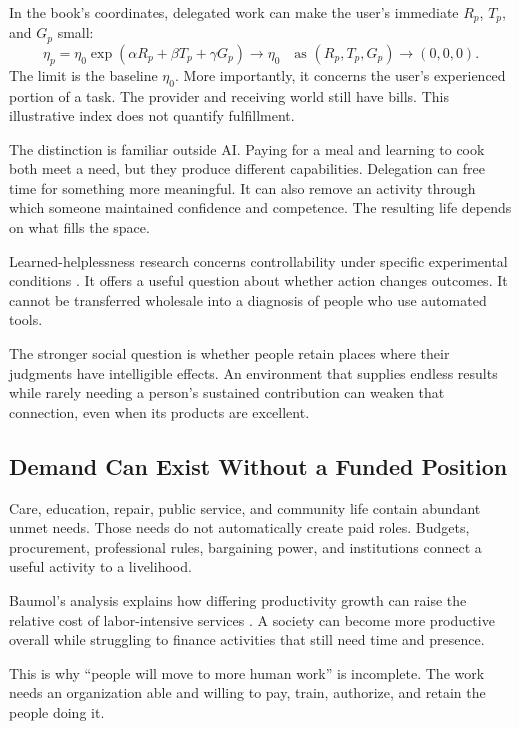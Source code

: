 In the book's coordinates, delegated work can make the user's immediate $R_p$, $T_p$, and $G_p$ small:
\begin{equation}
 \eta_p=\eta_0
 \exp(\alpha R_p+\beta T_p+\gamma G_p)
 \longrightarrow\eta_0
 \quad\text{as }(R_p,T_p,G_p)\to(0,0,0).
\end{equation}
The limit is the baseline $\eta_0$. More importantly, it concerns the user's experienced portion of a task. The provider and receiving world still have bills. This illustrative index does not quantify fulfillment.

The distinction is familiar outside AI. Paying for a meal and learning to cook both meet a need, but they produce different capabilities. Delegation can free time for something more meaningful. It can also remove an activity through which someone maintained confidence and competence. The resulting life depends on what fills the space.

Learned-helplessness research concerns controllability under specific experimental conditions \cite{seligman1967failure,maier2016learned}. It offers a useful question about whether action changes outcomes. It cannot be transferred wholesale into a diagnosis of people who use automated tools.

The stronger social question is whether people retain places where their judgments have intelligible effects. An environment that supplies endless results while rarely needing a person's sustained contribution can weaken that connection, even when its products are excellent.

\subsection{Demand Can Exist Without a Funded Position}

Care, education, repair, public service, and community life contain abundant unmet needs. Those needs do not automatically create paid roles. Budgets, procurement, professional rules, bargaining power, and institutions connect a useful activity to a livelihood.

Baumol's analysis explains how differing productivity growth can raise the relative cost of labor-intensive services \cite{baumol1967macro}. A society can become more productive overall while struggling to finance activities that still need time and presence.

This is why “people will move to more human work” is incomplete. The work needs an organization able and willing to pay, train, authorize, and retain the people doing it.

